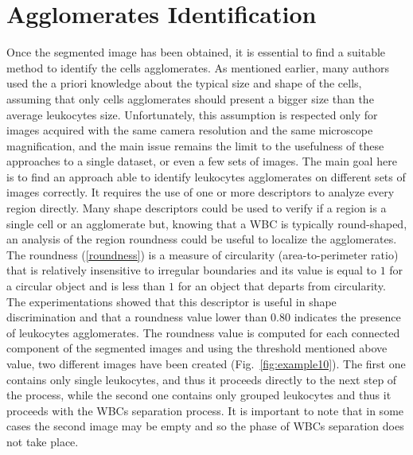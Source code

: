 \documentclass[final,a4paper,12pt,english]{UnicaPhdThesis3}
\begin{document}
{\section{Agglomerates Identification} 
Once the segmented image has been obtained, it is essential to find a suitable method to identify the cells agglomerates. As mentioned earlier, many authors used the a priori knowledge about the typical size and shape of the cells, assuming that only cells agglomerates should present a bigger size than the average leukocytes size. Unfortunately, this assumption is respected only for images acquired with the same camera resolution and the same microscope magnification, and the main issue remains the limit to the usefulness of these approaches to a single dataset, or even a few sets of images. The main goal here is to find an approach able to identify leukocytes agglomerates on different sets of images correctly. It requires the use of one or more descriptors to analyze every region directly. Many shape descriptors could be used to verify if a region is a single cell or an agglomerate \cite{Gonz} but, knowing that a WBC is typically round-shaped, an analysis of the region roundness could be useful to localize the agglomerates. The roundness (\ref{roundness}) is a measure of circularity (area-to-perimeter ratio) that is relatively insensitive to irregular boundaries and its value is equal to $1$ for a circular object and is less than $1$ for an object that departs from circularity. The experimentations showed that this descriptor is useful in shape discrimination and that a roundness value lower than $0.80$ indicates the presence of leukocytes agglomerates. The roundness value is computed for each connected component of the segmented images and using the threshold mentioned above value, two different images have been created (Fig.~\ref{fig:example10}). The first one contains only single leukocytes, and thus it proceeds directly to the next step of the process, while the second one contains only grouped leukocytes and thus it proceeds with the WBCs separation process. It is important to note that in some cases the second image may be empty and so the phase of WBCs separation does not take place.    

}
\end{document}
